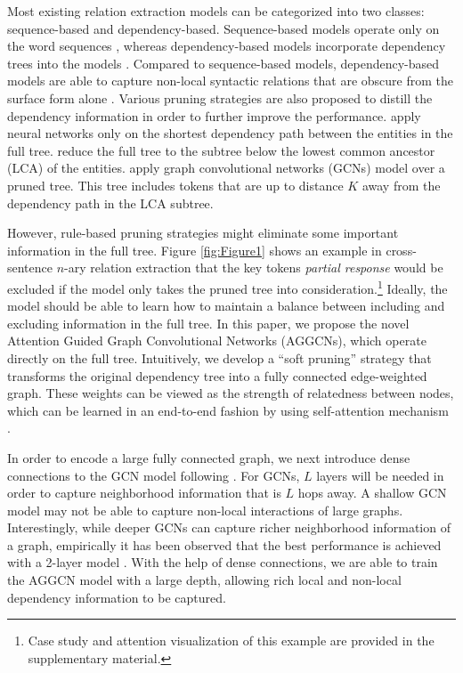 \documentclass[11pt,a4paper]{article}
\begin{document}
Most existing relation extraction models can be categorized into two classes: sequence-based and dependency-based. Sequence-based models operate only on the word sequences \citep{Zeng2014RelationCV, Wang2016RelationCV}, whereas dependency-based models incorporate dependency trees into the models \citep{Bunescu2005ASP, Peng2017CrossSentenceNR}. Compared to sequence-based models, dependency-based models are able to capture non-local syntactic relations that are obscure from the surface form alone \citep{Zhang2018GraphCO}. Various pruning strategies are also proposed to distill the dependency information in order to further improve the performance. \citet{Xu2015SemanticRC, Xu2015ClassifyingRV} apply neural networks only on the shortest dependency path between the entities in the full tree. \citet{Miwa2016EndtoEndRE} reduce the full tree to the subtree below the lowest common ancestor (LCA) of the entities. \citet{Zhang2018GraphCO} apply graph convolutional networks (GCNs) \citep{Kipf2016SemiSupervisedCW} model over a pruned tree. This tree includes tokens that are up to distance $K$ away from the dependency path in the LCA subtree. 

However, rule-based pruning strategies might eliminate some important information in the full tree. Figure \ref{fig:Figure1} shows an example in cross-sentence $n$-ary relation extraction that the key tokens \textit{partial response} would be excluded if the model only takes the pruned tree into consideration.\footnote{Case study and attention visualization of this example are provided in the supplementary material.} Ideally, the model should be able to learn how to maintain a balance between including and excluding information in the full tree. In this paper, we propose the novel Attention Guided Graph Convolutional Networks (AGGCNs), which operate directly on the full tree. Intuitively, we develop a ``soft pruning'' strategy that transforms the original dependency tree into a fully connected edge-weighted graph. These weights can be viewed as the strength of relatedness between nodes, which can be learned in an end-to-end fashion by using self-attention mechanism \citep{Vaswani2017AttentionIA}.



In order to encode a large fully connected graph, we next introduce dense connections \citep{Huang2017DenselyCC} to the GCN model following \citep{dcgcnforgraph2seq19guo}. For GCNs, $L$ layers will be needed in order to capture neighborhood information that is $L$ hops away. A shallow GCN model may not be able to capture non-local interactions of large graphs. Interestingly, while deeper GCNs can capture richer neighborhood information of a graph, empirically it has been observed that the best performance is achieved with a 2-layer model \citep{Xu2018RepresentationLO}. With the help of dense connections, we are able to train the AGGCN model with a large depth, allowing rich local and non-local dependency information to be captured.
\end{document}
